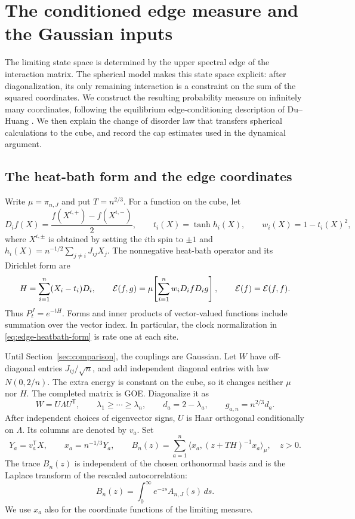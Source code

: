 \section{The conditioned edge measure and the Gaussian inputs}
\label{sec:edge-law}

The limiting state space is determined by the upper spectral edge of the
interaction matrix.  The spherical model makes this state space explicit:
after diagonalization, its only remaining interaction is a constraint on the
sum of the squared coordinates.  We construct the resulting probability measure on infinitely many coordinates, following the equilibrium
edge-conditioning description of Du--Huang \cite[Section~2]{DuHuang2026Overlap}.  We then explain the change of disorder law that transfers spherical
calculations to the cube, and record the cap estimates used in the dynamical
argument.

\subsection{The heat-bath form and the edge coordinates}

Write $\mu=\pi_{n,J}$ and put $T=n^{2/3}$.  For a function on the cube, let
\[
 D_i f(X)=\frac{f(X^{i,+})-f(X^{i,-})}{2},\qquad
 t_i(X)=\tanh h_i(X),\qquad w_i(X)=1-t_i(X)^2,
\]
where $X^{i,\pm}$ is obtained by setting the $i$th spin to $\pm1$ and
$h_i(X)=n^{-1/2}\sum_{j\ne i}J_{ij}X_j$.  The nonnegative heat-bath
operator and its Dirichlet form are
\begin{equation}\label{eq:edge-heatbath-form}
 H=\sum_{i=1}^n(X_i-t_i)D_i,
 \qquad
 \mathcal E(f,g)=\mu\!\left[\sum_{i=1}^n w_iD_ifD_ig\right],
 \qquad \mathcal E(f)=\mathcal E(f,f).
\end{equation}
Thus $P_t^J=e^{-tH}$.  Forms and inner products of vector-valued functions
include summation over the vector index.  In particular, the clock
normalization in \eqref{eq:edge-heatbath-form} is rate one at each site.

Until Section~\ref{sec:comparison}, the couplings are Gaussian.  Let $W$ have
off-diagonal entries $J_{ij}/\sqrt n$, and add independent diagonal entries
with law $N(0,2/n)$.  The extra energy is constant on the cube, so it changes
neither $\mu$ nor $H$.  The completed matrix is GOE.  Diagonalize it as
\[
 W=U\Lambda U^{\mathsf T},\qquad
 \lambda_1\ge\cdots\ge\lambda_n,
 \qquad d_a=2-\lambda_a,\qquad g_{a,n}=n^{2/3}d_a.
\]
After independent choices of eigenvector signs, $U$ is Haar orthogonal
conditionally on $\Lambda$.  Its columns are denoted by $v_a$.  Set
\[
 Y_a=v_a^{\mathsf T}X,\qquad x_a=n^{-1/3}Y_a,
 \qquad
 B_n(z)=\sum_{a=1}^n\langle x_a,(z+TH)^{-1}x_a\rangle_\mu,
 \quad z>0.
\]
The trace $B_n(z)$ is independent of the chosen orthonormal basis and is
the Laplace transform of the rescaled autocorrelation:
\[
 B_n(z)=\int_0^\infty e^{-zs}A_{n,J}(s)\,ds.
\]
We use $x_a$ also for the coordinate functions of the limiting measure.


